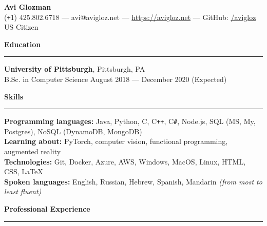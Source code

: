 \documentclass[11pt]{article}
\begin{document}
	\pagestyle{empty}
	\begin{center}
		{\LARGE \textbf{Avi Glozman}}\\
		\vspace{1.25mm}
		{\large (\texttt{+}1) 425.802.6718 --- avi@avigloz.net --- \href{https://avigloz.net}{https://avigloz.net} --- GitHub: \href{https://github.com/avigloz}{/avigloz}}\\
		\vspace{1mm}
		US Citizen
	\end{center}
	
	\begin{flushleft}
		
		\vspace{-1.65mm}
		{\large \raggedright \textbf{Education}}
		\vspace{1.25mm}
	
		\hrule
	
		\vspace{2.25mm}
		\textbf{University of Pittsburgh}, Pittsburgh, PA\\
		{\small B.Sc. in Computer Science \hfill August 2018 --- December 2020 (Expected)}
	
		\vspace{1.5mm}
		{\large \raggedright \textbf{Skills}}
		\vspace{1.25mm}
	
		\hrule
	
		\vspace{2.25mm}
		\textbf{Programming languages:} Java, Python, C, C\texttt{++}, C\verb!#!, Node.js, SQL (MS, My, Postgres), NoSQL (DynamoDB, MongoDB)\\
		\textbf{Learning about:} PyTorch, computer vision, functional programming, augmented reality\\
		\textbf{Technologies:} Git, Docker, Azure, AWS, Windows, MacOS, Linux, HTML, CSS, \LaTeX\\
		\textbf{Spoken languages:} English, Russian, Hebrew, Spanish, Mandarin \textit{(from most to least fluent)}
		
		\vspace{1.35mm}
		{\large \raggedright \textbf{Professional Experience}}
		\vspace{1.25mm}
	
		\hrule


\end{flushleft}
\end{document}
